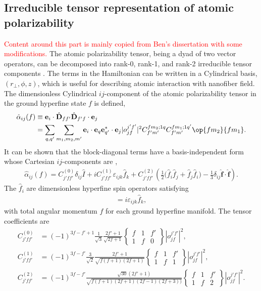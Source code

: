 \documentclass[]{report}
\begin{document}
\subsection{Irreducible tensor representation of atomic polarizability}
\textcolor{red}{Content around this part is mainly copied from Ben's dissertation with some modifications.}
The atomic polarizability tensor, being a dyad of two vector operators, can be decomposed into rank-0, rank-1, and rank-2 irreducible tensor components \cite{Stockton2007, Hammerer2006, Geremia2006, Deutsch2010a, LeKien2013}.  The terms in the Hamiltonian can be written in a Cylindrical basis, $ (r\!_\perp,\phi,z) $, which is useful for describing atomic interaction with nanofiber field. The dimensionless Cylindrical $ij$-component of the atomic polarizability tensor in the ground hyperfine state $f$ is defined,
\begin{align} \label{Eq::alphaij}
\hat{\alpha}_{ij}(f) &\equiv \mathbf{e}_i \cdot \hat{\mathbf{D}}_{f f'} \hat{\mathbf{D}}_{f' f} \cdot \mathbf{e}_j\\
&= \sum_{q,q'} \sum_{m_1, m_2, m'} \mathbf{e}_i \cdot\mathbf{e}_q \mathbf{e}^*_{q'}\cdot \mathbf{e}_j | o^{j'f'}_{jf} |^2 C^{fm_2;1q}_{f'm'} C^{fm_1;1q'}_{f'm'} \op{f m_2}{f m_1}.
\end{align}	
It can be shown that the block-diagonal terms have a basis-independent form whose Cartesian $ij$-components are \cite{Deutsch2010a},
	\begin{align} \label{Eq::IrreducibleDecomp}
		\hat{\alpha}_{ij} (f) = C_{j' f f'}^{(0)} \delta_{ij} \hat{ I } + i C_{j' f f'}^{(1)} \varepsilon_{ijk} \hat{f}_k + C_{j' f f'}^{(2)} \left(\frac{1}{2} \big(\hat{f}_i \hat{f}_j + \hat{f}_j \hat{f}_i \big) - \frac{1}{3} \delta_{ij} \hat{ \mathbf{f} } \cdot \hat{ \mathbf{f} }  \right).  
	\end{align}
The $\hat{f}_i$ are dimensionless hyperfine spin operators satisfying
	\begin{align}
		[\hat{f}_i, \hat{f}_j] = i \varepsilon_{ijk} \hat{f}_k,
	\end{align}
with total angular momentum $f$ for each ground hyperfine manifold.  The tensor coefficients are~\cite{Deutsch2010a}
		\begin{align}
			C_{j' f f'}^{(0)} &= (-1)^{3f - f' + 1} \frac{1}{ \sqrt{3} } \frac{2f'+1}{\sqrt{2f+1}}  \left\{ \begin{array}{ccc} f& 1 & f' \\ 1 & f & 0 \end{array} \right\} |o^{j' f'}_{j f}|^2, \\
			C_{j' f f'}^{(1)} &= (-1)^{3f - f' } \frac{3}{ \sqrt{2} } \frac{2f'+1}{ \sqrt{f(f+1)(2f+1)} }  \left\{ \begin{array}{ccc} f & 1 & f' \\ 1 & f & 1 \end{array} \right\} |o^{j' f'}_{j f}|^2, \\
			C_{j' f f'}^{(2)} &= (-1)^{3f - f' } \frac{\sqrt{30} (2f'+1)}{\sqrt{ f(f+1)(2f+1)(2f-1)(2f+3))} }  \left\{ \begin{array}{ccc} f & 1 & f' \\ 1 & f & 2 \end{array} \right\} |o^{j' f'}_{j f}|^2 .
		\end{align}	
\end{document}
